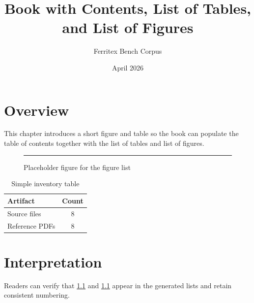 \documentclass{book}
\title{Book with Contents, List of Tables, and List of Figures}
\author{Ferritex Bench Corpus}
\date{April 2026}
\begin{document}
\maketitle
\tableofcontents
\listoftables
\listoffigures

\chapter{Overview}
This chapter introduces a short figure and table so the book can populate the
table of contents together with the list of tables and list of figures.

\begin{figure}[ht]
\centering
\rule{0.7\textwidth}{2.2cm}
\caption{Placeholder figure for the figure list}
\label{fig:placeholder}
\end{figure}

\begin{table}[ht]
\centering
\begin{tabular}{|l|c|}
\hline
Artifact & Count \\
\hline
Source files & 8 \\
Reference PDFs & 8 \\
\hline
\end{tabular}
\caption{Simple inventory table}
\label{tab:inventory}
\end{table}

\chapter{Interpretation}
Readers can verify that \ref{fig:placeholder} and \ref{tab:inventory} appear
in the generated lists and retain consistent numbering.
\end{document}
